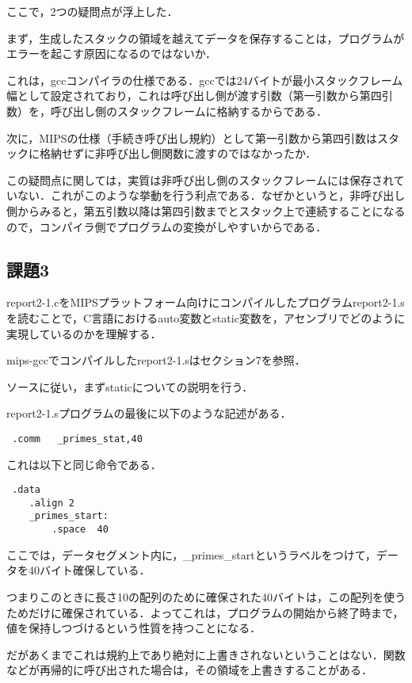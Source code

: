 \documentclass[a4j]{jarticle}
\begin{document}
ここで，2つの疑問点が浮上した．

まず，生成したスタックの領域を越えてデータを保存することは，プログラムがエラーを起こす原因になるのではないか．

これは，gccコンパイラの仕様である．gccでは24バイトが最小スタックフレーム幅として設定されており，これは呼び出し側が渡す引数（第一引数から第四引数）を，呼び出し側のスタックフレームに格納するからである．

次に，MIPSの仕様（手続き呼び出し規約）として第一引数から第四引数はスタックに格納せずに非呼び出し側関数に渡すのではなかったか．

この疑問点に関しては，実質は非呼び出し側のスタックフレームには保存されていない．これがこのような挙動を行う利点である．なぜかというと，非呼び出し側からみると，第五引数以降は第四引数までとスタック上で連続することになるので，コンパイラ側でプログラムの変換がしやすいからである．




\subsection{課題3}

report2-1.cをMIPSプラットフォーム向けにコンパイルしたプログラムreport2-1.sを読むことで，C言語におけるauto変数とstatic変数を，アセンブリでどのように実現しているのかを理解する．

mips-gccでコンパイルしたreport2-1.sはセクション7を参照．


ソースに従い，まずstaticについての説明を行う．

report2-1.sプログラムの最後に以下のような記述がある．

\begin{verbatim}
 .comm   _primes_stat,40
\end{verbatim}

これは以下と同じ命令である．

\begin{verbatim}
 .data
    .align 2
    _primes_start:
        .space  40
\end{verbatim}

ここでは，データセグメント内に，\_primes\_startというラベルをつけて，データを40バイト確保している．

つまりこのときに長さ10の配列のために確保された40バイトは，この配列を使うためだけに確保されている．よってこれは，プログラムの開始から終了時まで，値を保持しつづけるという性質を持つことになる．

だがあくまでこれは規約上であり絶対に上書きされないということはない．関数などが再帰的に呼び出された場合は，その領域を上書きすることがある．
\end{document}
